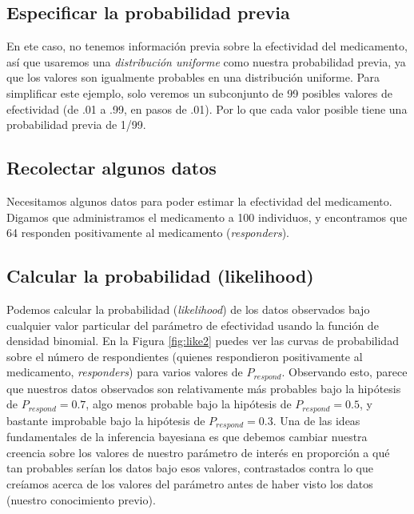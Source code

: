 \documentclass[
  12pt,
]{book}
\begin{document}
\hypertarget{especificar-la-probabilidad-previa-1}{%
\subsection{Especificar la probabilidad previa}\label{especificar-la-probabilidad-previa-1}}

En ete caso, no tenemos información previa sobre la efectividad del medicamento, así que usaremos una \emph{distribución uniforme} como nuestra probabilidad previa, ya que los valores son igualmente probables en una distribución uniforme. Para simplificar este ejemplo, solo veremos un subconjunto de 99 posibles valores de efectividad (de .01 a .99, en pasos de .01). Por lo que cada valor posible tiene una probabilidad previa de 1/99.

\hypertarget{recolectar-algunos-datos}{%
\subsection{Recolectar algunos datos}\label{recolectar-algunos-datos}}

Necesitamos algunos datos para poder estimar la efectividad del medicamento. Digamos que administramos el medicamento a 100 individuos, y encontramos que 64 responden positivamente al medicamento (\emph{responders}).

\hypertarget{calcular-la-probabilidad-likelihood-1}{%
\subsection{Calcular la probabilidad (likelihood)}\label{calcular-la-probabilidad-likelihood-1}}

Podemos calcular la probabilidad (\emph{likelihood}) de los datos observados bajo cualquier valor particular del parámetro de efectividad usando la función de densidad binomial. En la Figura \ref{fig:like2} puedes ver las curvas de probabilidad sobre el número de respondientes (quienes respondieron positivamente al medicamento, \emph{responders}) para varios valores de \(P_ {respond}\). Observando esto, parece que nuestros datos observados son relativamente más probables bajo la hipótesis de \(P_ {respond} = 0.7\), algo menos probable bajo la hipótesis de \(P_ {respond} = 0.5\), y bastante improbable bajo la hipótesis de \(P_ {respond} = 0.3\). Una de las ideas fundamentales de la inferencia bayesiana es que debemos cambiar nuestra creencia sobre los valores de nuestro parámetro de interés en proporción a qué tan probables serían los datos bajo esos valores, contrastados contra lo que creíamos acerca de los valores del parámetro antes de haber visto los datos (nuestro conocimiento previo).
\end{document}
